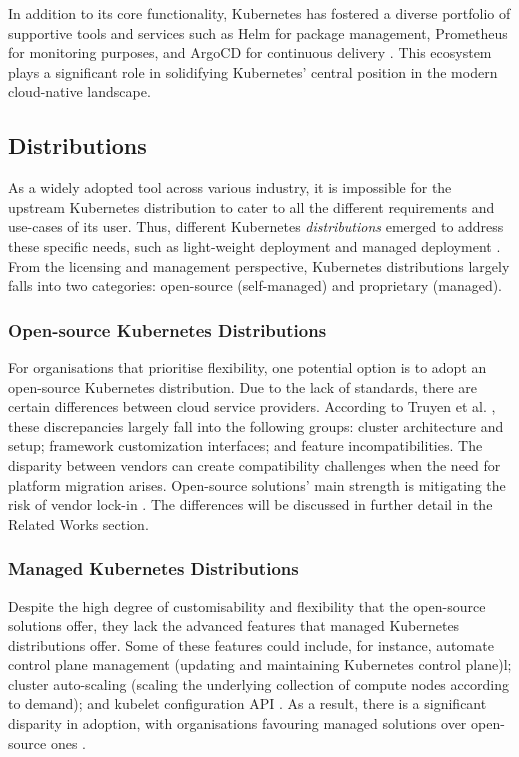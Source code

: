 In addition to its core functionality, Kubernetes has fostered a diverse portfolio of supportive tools and services such as Helm for package management, Prometheus for monitoring purposes, and ArgoCD for continuous delivery \cite{Helm, prometheusOverviewPrometheus, ArgoCDDeclarative}. This ecosystem plays a significant role in solidifying Kubernetes' central position in the modern cloud-native landscape.

\subsection{Distributions}
As a widely adopted tool across various industry, it is impossible for the upstream Kubernetes distribution to cater to all the different requirements and use-cases of its user. Thus, different Kubernetes \textit{distributions} emerged to address these specific needs, such as light-weight deployment and managed deployment \cite{bohmProfilingLightweightContainer2021, pereiraferreiraPerformanceEvaluationContainers2019}. From the licensing and management perspective, Kubernetes distributions largely falls into two categories: open-source (self-managed) and proprietary (managed).

\subsubsection{Open-source Kubernetes Distributions}

For organisations that prioritise flexibility, one potential option is to adopt an open-source Kubernetes distribution. Due to the lack of standards, there are certain differences between cloud service providers. According to Truyen et al. \cite{truyenManagingFeatureCompatibility2020}, these discrepancies largely fall into the following groups: cluster architecture and setup; framework customization interfaces; and feature incompatibilities. The disparity between vendors can create compatibility challenges when the need for platform migration arises. Open-source solutions' main strength is mitigating the risk of vendor lock-in \cite{shaikh2011total}. The differences will be discussed in further detail in the Related Works section.

\subsubsection{Managed Kubernetes Distributions}

Despite the high degree of customisability and flexibility that the open-source solutions offer, they lack the advanced features that managed Kubernetes distributions offer. Some of these features could include, for instance, automate control plane management (updating and maintaining Kubernetes control plane)l; cluster auto-scaling (scaling the underlying collection of compute nodes according to demand); and kubelet configuration API \cite{truyenManagingFeatureCompatibility2020, KubeletConfigMachineconfigurationopenshiftioV1, AmazonEKSCustomers, RedHatOpenShiftb}. As a result, there is a significant disparity in adoption, with organisations favouring managed solutions over open-source ones \cite{redhatinc.StateKubernetesSecurity2024}.

